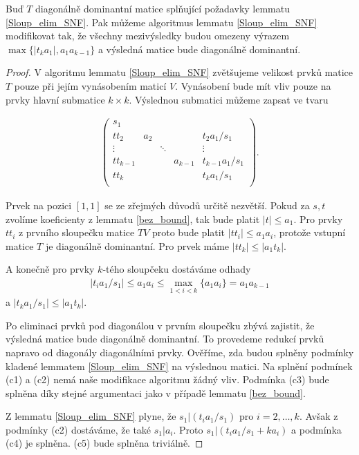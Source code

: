 \begin{lem}\label{Sloup_elim_SNF_modified}
Buď $ T $ diagonálně dominantní matice splňující požadavky lemmatu \ref{Sloup_elim_SNF}.
Pak můžeme algoritmus lemmatu \ref{Sloup_elim_SNF} modifikovat tak, že všechny
mezivýsledky budou omezeny výrazem 
$ \max\{ |t_k a_1|, a_1 a_{k - 1} \}  $ 
a výsledná matice bude diagonálně dominantní.
\end{lem}
\begin{proof}
V algoritmu lemmatu \ref{Sloup_elim_SNF} zvětšujeme velikost prvků matice $ T $
pouze při jejím vynásobením maticí $ V $. Vynásobení bude mít vliv pouze na
prvky hlavní submatice $ k \times k $. Výslednou submatici můžeme zapsat ve tvaru

\begin{align*}
    \left(
    \begin{array}{ccccc}
        s_1        &     &        &         &                 \\
        tt_2       & a_2 &        &         & t_2 a_1/s_1     \\
        \vdots     &     & \ddots &         & \vdots          \\
        tt_{k - 1} &     &        & a_{k-1} & t_{k-1} a_1/s_1 \\
        tt_k       &     &        &         & t_k a_1/s_1     \\
    \end{array}
    \right)
.
\end{align*}

Prvek na pozici $ [1,1] $ se ze zřejmých důvodů určitě nezvětší. Pokud za $ s, t $
zvolíme koeficienty z lemmatu \ref{bez_bound}, tak bude platit $ |t| \leq a_1 $.
Pro prvky $ t t_i $ z prvního sloupečku matice $ TV $ proto bude platit
$ |t t_i| \leq a_1 a_i $, protože vstupní matice $ T $ je diagonálně dominantní.
Pro prvek máme $ |t t_k| \leq |a_1 t_k| $.

A konečně pro prvky $ k $-tého sloupčeku dostáváme odhady
\begin{align*}
|t_i a_1 / s_1| \leq a_1 a_i \leq \max\limits_{1 < i < k }\{ a_1 a_{i} \} = a_1 a_{k - 1}
\end{align*}
a $ |t_k a_1 / s_1| \leq |a_1 t_k| $.

Po eliminaci prvků pod diagonálou v prvním sloupečku zbývá zajistit, že
výsledná matice bude diagonálně dominantní. To provedeme redukcí
prvků napravo od diagonály diagonálními prvky. Ověříme, zda budou splněny
podmínky kladené lemmatem \ref{Sloup_elim_SNF} na výslednou matici.
Na splnění podmínek (c1) a (c2) nemá naše modifikace algoritmu žádný vliv.
Podmínka (c3) bude splněna díky stejné argumentaci jako v případě lemmatu
\ref{bez_bound}.

Z lemmatu \ref{Sloup_elim_SNF} plyne, že $ s_1 \vert (t_i a_1/s_1) $ pro
$ i = 2, \dots, k $. Avšak z podmínky (c2) dostáváme, že také $ s_1 \vert a_i $.
Proto $ s_1 \vert (t_i a_1/s_1 + k a_i) $ a podmínka (c4) je splněna. (c5) bude splněna
triviálně.
\end{proof}



